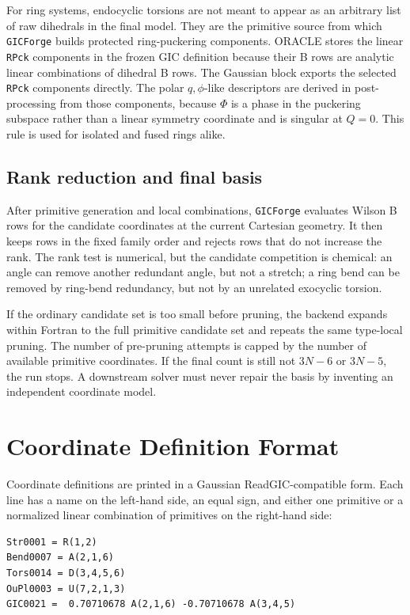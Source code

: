 \documentclass[11pt]{article}
\newcommand{\program}{\texttt{GICForge}}
\begin{document}
For ring systems, endocyclic torsions are not meant to appear as an arbitrary
list of raw dihedrals in the final model.  They are the primitive source from
which \program{} builds protected ring-puckering components.  ORACLE stores the
linear \texttt{RPck} components in the frozen GIC definition because their B
rows are analytic linear combinations of dihedral B rows.  The Gaussian block
exports the selected \texttt{RPck} components directly.  The polar
\(q,\phi\)-like descriptors are derived in post-processing from those
components, because \(\Phi\) is a phase in the puckering subspace rather than a
linear symmetry coordinate and is singular at \(Q=0\).  This rule is used for
isolated and fused rings alike.

\subsection{Rank reduction and final basis}

After primitive generation and local combinations, \program{} evaluates Wilson
B rows for the candidate coordinates at the current Cartesian geometry.  It then
keeps rows in the fixed family order and rejects rows that do not increase the
rank.  The rank test is numerical, but the candidate competition is chemical:
an angle can remove another redundant angle, but not a stretch; a ring bend can
be removed by ring-bend redundancy, but not by an unrelated exocyclic torsion.

If the ordinary candidate set is too small before pruning, the backend expands
within Fortran to the full primitive candidate set and repeats the same
type-local pruning.  The number of pre-pruning attempts is capped by the number
of available primitive coordinates.  If the final count is still not \(3N-6\)
or \(3N-5\), the run stops.  A downstream solver must never repair the basis by
inventing an independent coordinate model.

\section{Coordinate Definition Format}

Coordinate definitions are printed in a Gaussian ReadGIC-compatible form.  Each
line has a name on the left-hand side, an equal sign, and either one primitive
or a normalized linear combination of primitives on the right-hand side:

\begin{lstlisting}[style=oracle]
Str0001 = R(1,2)
Bend0007 = A(2,1,6)
Tors0014 = D(3,4,5,6)
OuPl0003 = U(7,2,1,3)
GIC0021 =  0.70710678 A(2,1,6) -0.70710678 A(3,4,5)
\end{lstlisting}
\end{document}
